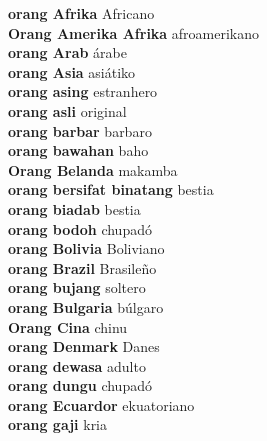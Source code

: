 \textbf{ orang Afrika  } Africano \\
\textbf{ Orang Amerika Afrika  } afroamerikano \\
\textbf{ orang Arab  } árabe \\
\textbf{ orang Asia  } asiátiko \\
\textbf{ orang asing  } estranhero \\
\textbf{ orang asli  } original \\
\textbf{ orang barbar  } barbaro \\
\textbf{ orang bawahan  } baho \\
\textbf{ Orang Belanda  } makamba \\
\textbf{ orang bersifat binatang  } bestia \\
\textbf{ orang biadab  } bestia \\
\textbf{ orang bodoh  } chupadó \\
\textbf{ orang Bolivia  } Boliviano \\
\textbf{ orang Brazil  } Brasileño \\
\textbf{ orang bujang  } soltero \\
\textbf{ orang Bulgaria  } búlgaro \\
\textbf{ Orang Cina  } chinu \\
\textbf{ orang Denmark  } Danes \\
\textbf{ orang dewasa  } adulto \\
\textbf{ orang dungu  } chupadó \\
\textbf{ orang Ecuardor  } ekuatoriano \\
\textbf{ orang gaji  } kria \\
